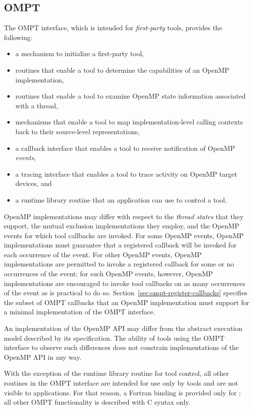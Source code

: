 \subsection{OMPT}

The OMPT interface, which is intended for \emph{first-party} tools,
provides the following:
\begin{itemize}
\item a mechanism to initialize a first-party tool,
\item routines that enable a tool to determine the capabilities of an
  OpenMP implementation,
\item routines that enable a tool to examine OpenMP state information associated with a thread,
\item mechanisms that enable a tool to map implementation-level calling
  contexts back to their source-level representations,
\item a callback interface that enables a tool to receive notification
  of OpenMP \emph{events},
\item a tracing interface that enables a tool to trace activity on OpenMP target devices, and
\item a runtime library routine that an application can use to control a tool.
\end{itemize}

OpenMP implementations may differ with respect to the \emph{thread states} that
they support, the mutual exclusion implementations they employ,
and the OpenMP events for which tool callbacks are invoked. For some OpenMP events,
OpenMP implementations must guarantee that a registered callback will be invoked for each occurrence of the
event. For other OpenMP events, OpenMP implementations are permitted to invoke a registered callback for some
or no occurrences of the event; for such
OpenMP events, however,
OpenMP implementations are encouraged to invoke tool callbacks on as
many occurrences of the event as is practical to do so.
Section~\ref{sec:ompt-register-callbacks} specifies the subset of OMPT
callbacks that an OpenMP implementation must support for a minimal
implementation of the OMPT interface.

An implementation of the OpenMP API may differ from the
abstract execution model described by its specification.  The ability
of tools using the OMPT interface to observe such differences does not constrain
implementations of the OpenMP API in any way.

With the exception of the  runtime library routine for tool control,
all other routines in the OMPT interface are intended for use only by tools and
are not visible to applications.
For that reason, a Fortran binding is provided only
for ;
all other OMPT functionality is described with C syntax only.

